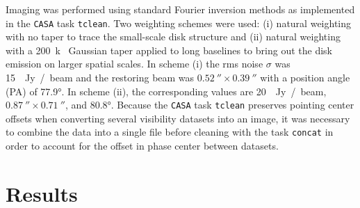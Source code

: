 \documentclass[modern]{aastex62}
\begin{document}
Imaging was performed using standard Fourier inversion methods as implemented in the \texttt{CASA} task \texttt{tclean}. 
Two weighting schemes were used: (i) natural weighting with no taper to trace the small-scale disk structure and (ii) natural weighting with a \SI{200}{k\lambda} Gaussian taper applied to long baselines to bring out the disk emission on larger spatial scales. 
In scheme (i) the rms noise $\sigma$ was \SI{15}{\mu Jy / beam} and the restoring beam was $\SI{0.52}{\arcsecond} \times \SI{0.39}{\arcsecond}$ with a position angle (PA) of \ang[angle-symbol-over-decimal]{77.9}. 
In scheme (ii), the corresponding values are \SI{20}{\mu Jy / beam}, $\SI{0.87}{\arcsecond} \times \SI{0.71}{\arcsecond}$, and \ang[angle-symbol-over-decimal]{80.8}.
Because the \texttt{CASA} task \texttt{tclean} preserves pointing center offsets when converting several visibility datasets into an image, it was necessary to combine the data into a single file before cleaning with the task \texttt{concat} in order to account for the offset in phase center between datasets. 

\section{Results}
\label{section: results}
\end{document}
